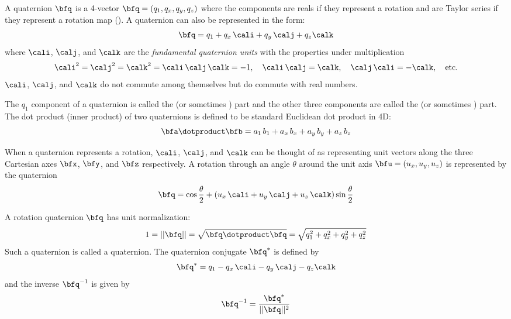 {A quaternion $\bfq$ is a 4-vector $\bfq = (q_1, q_x, q_y, q_z)$ where the components are reals if they represent a
rotation and are Taylor series if they represent a rotation map (). A quaternion can
also be represented in the form:
\begin{equation}
  \bfq = q_1 + q_x \, \cali + q_y \, \calj + q_z \calk
  \label{qqqqq}
\end{equation}
where $\cali$, $\calj$, and $\calk$ are the {\em fundamental quaternion units} with the properties
under multiplication
\begin{equation}
  \cali^2 = \calj^2 = \calk^2 = \cali \, \calj \, \calk = -1, \quad 
  \cali \, \calj = \calk, \quad \calj \, \cali = -\calk, \quad \text{etc.}
\end{equation}
$\cali$, $\calj$, and $\calk$ do not commute among themselves but do commute with real numbers. 

The $q_1$ component of a quaternion is called the  (or sometimes ) part and the
other three components are called the  (or sometimes ) part. The dot
product (inner product) of two quaternions is defined to be standard Euclidean dot product in 4D:
\begin{equation}
  \bfa \dotproduct \bfb = a_1 \, b_1 + a_x \, b_x + a_y \, b_y + a_z \, b_z
\end{equation}

When a quaternion represents a rotation, $\cali$, $\calj$, and $\calk$ can be thought of as representing unit
vectors along the three Cartesian axes $\bfx$, $\bfy$, and $\bfz$ respectively. A rotation through an angle
$\theta$ around the unit axis $\bfu = (u_x, u_y, u_z)$ is represented by the quaternion
\begin{equation}
  \bfq = \cos\frac{\theta}{2} + (u_x \, \cali + u_y \, \calj + u_z \, \calk) \sin\frac{\theta}{2}
  \label{qt2ui}
\end{equation}

A rotation quaternion $\bfq$ has unit normalization:
\begin{equation}
  1 = ||\bfq|| = \sqrt{\bfq \dotproduct \bfq} = \sqrt{q_1^2 + q_x^2 + q_y^2 + q_z^2}
  \label{1qqq}
\end{equation}
Such a quaternion is called a  quaternion.
The quaternion conjugate $\bfq^*$ is defined by
\begin{equation}
  \bfq^* = q_1 - q_x \, \cali - q_y \, \calj - q_z \calk
\end{equation}
and the inverse $\bfq^{-1}$ is given by
\begin{equation}
  \bfq^{-1} = \frac{\bfq^*}{||\bfq||^2}
\end{equation}

}
